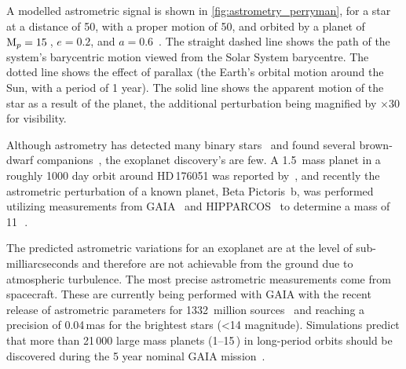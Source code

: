 A modelled astrometric signal is shown in \cref{fig:astrometry_perryman}, for a star at a distance of 50\pc, with a proper motion of 50\masperyr{}, and orbited by a planet of $\textrm{M}_{p} = 15$\,\Mjup{}, $e = 0.2$, and $a = 0.6$\AU~\citep{perryman_extrasolar_2000}.
The straight dashed line shows the path of the system's barycentric motion viewed from the Solar System barycentre.
The dotted line shows the effect of parallax (the Earth's orbital motion around the Sun, with a period of 1 year).
The solid line shows the apparent motion of the star as a result of the planet, the additional perturbation being magnified by $\times 30$ for visibility.

Although astrometry has detected many binary stars~\citep[e.g.][]{gontcharov_new_2000} and found several brown-dwarf companions~\citep[e.g.][]{sahlmann_search_2011}, the exoplanet discovery's are few.
A 1.5\,\Mjup{} mass planet in a roughly 1000 day orbit around {HD\,176051} was reported by~\citet{muterspaugh_phases_2010}, and recently the astrometric perturbation of a known planet, {Beta Pictoris~b}, was performed utilizing measurements from {GAIA}~\citep{collaboration_gaia_2016a} and {HIPPARCOS}~\citep{esa_hipparcos_1997} to determine a mass of 11\,\Mjup~\citep{snellen_mass_2018}.

The predicted astrometric variations for an exoplanet are at the level of sub-milliarcseconds and therefore are not achievable from the ground due to atmospheric turbulence.
The most precise astrometric measurements come from spacecraft.
These are currently being performed with GAIA with the recent release of astrometric parameters for 1332~million sources~\citep{collaboration_gaia_2018} and reaching a precision of 0.04\,mas for the brightest stars (<14 magnitude).
Simulations predict that more than 21\,000 large mass planets (1--15\,\Mjup) in long-period orbits should be discovered during the 5 year nominal GAIA mission~\citep{perryman_astrometric_2014}.

